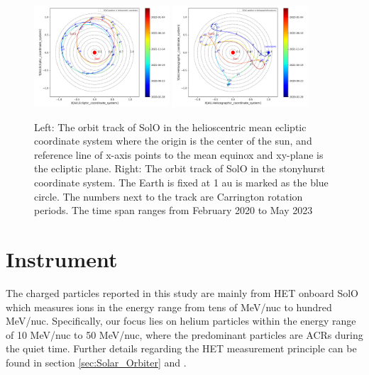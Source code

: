 \begin{figure}
    \centering
    \includegraphics[width=0.45\textwidth]{images/ACR/SOLO_orbit_track_helioscentric_3.png}
    \includegraphics[width = 0.45\textwidth]{images/ACR/SOLO_orbit_stonyhurst_3.png}
    \caption[Orbit track of \ac{Solo}]{Left: The orbit track of \ac{SolO} in the helioscentric mean ecliptic coordinate system where the origin is the center of the sun, and reference line of x-axis points to the mean equinox and xy-plane is the ecliptic plane. Right: The orbit track of \ac{SolO} in the stonyhurst coordinate system. The Earth is fixed at 1 au is marked as the blue circle. 
    The numbers next to the track are Carrington rotation periods. The time span ranges from February 2020 to May 2023}
    \label{fig:SOLO_orbit_track}
\end{figure}




\section{Instrument}


The charged particles reported in this study are mainly from \acl{HET} onboard \ac{SolO} which measures ions in the energy range from tens of MeV/nuc to hundred MeV/nuc. Specifically, our focus lies on helium particles within the energy range of 10 MeV/nuc to 50 MeV/nuc, where the predominant particles are \acp{ACR} during the quiet time. Further details regarding the \ac{HET} measurement principle can be found in section \ref{sec:Solar_Orbiter} and \citet{RodriguezPacheco-2019-EPD}.

